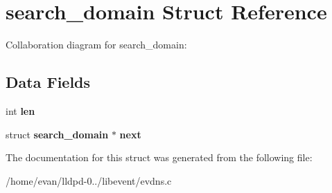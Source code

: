 \section{search\-\_\-domain \-Struct \-Reference}
\label{structsearch__domain}


\-Collaboration diagram for search\-\_\-domain\-:
\subsection*{\-Data \-Fields}
\begin{DoxyCompactItemize}
\item 
int {\bfseries len}\label{structsearch__domain_afed088663f8704004425cdae2120b9b3}

\item 
struct {\bf search\-\_\-domain} $\ast$ {\bfseries next}\label{structsearch__domain_a3e7a0c151f44a87eee41a231e480b7d4}

\end{DoxyCompactItemize}


\-The documentation for this struct was generated from the following file\-:\begin{DoxyCompactItemize}
\item 
/home/evan/lldpd-\/0../libevent/evdns.\-c\end{DoxyCompactItemize}
